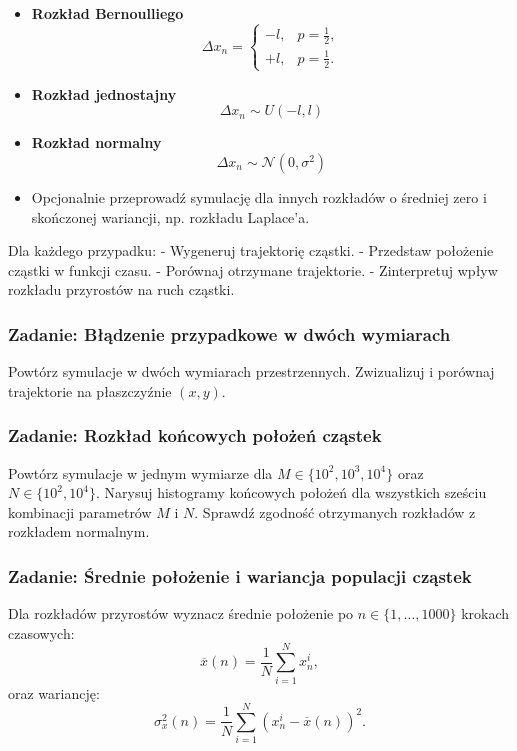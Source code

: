 \documentclass[
  polish,
  letterpaper,
  DIV=11,
  numbers=noendperiod]{scrartcl}
\begin{document}
\begin{itemize}
\item
  \textbf{Rozkład Bernoulliego} \[
  \Delta x_n=
  \begin{cases}
  -l, & p=\frac{1}{2},\\
  +l, & p=\frac{1}{2}.
  \end{cases}
  \]
\item
  \textbf{Rozkład jednostajny} \[\Delta x_n\sim U(-l,l)\]
\item
  \textbf{Rozkład normalny} \[\Delta x_n\sim\mathcal{N}(0,\sigma^2)
  \]
\item
  Opcjonalnie przeprowadź symulację dla innych rozkładów o średniej zero
  i skończonej wariancji, np. rozkładu Laplace'a.
\end{itemize}

Dla każdego przypadku: - Wygeneruj trajektorię cząstki. - Przedstaw
położenie cząstki w funkcji czasu. - Porównaj otrzymane trajektorie. -
Zinterpretuj wpływ rozkładu przyrostów na ruch cząstki.

\subsubsection{Zadanie: Błądzenie przypadkowe w dwóch
wymiarach}\label{zadanie-bux142ux105dzenie-przypadkowe-w-dwuxf3ch-wymiarach}

Powtórz symulacje w dwóch wymiarach przestrzennych. Zwizualizuj i
porównaj trajektorie na płaszczyźnie \((x,y)\).

\subsubsection{Zadanie: Rozkład końcowych położeń
cząstek}\label{zadanie-rozkux142ad-koux144cowych-poux142oux17ceux144-czux105stek}

Powtórz symulacje w jednym wymiarze dla \(M\in\{10^2,10^3,10^4\}\) oraz
\(N\in\{10^2,10^4\}\). Narysuj histogramy końcowych położeń dla
wszystkich sześciu kombinacji parametrów \(M\) i \(N\). Sprawdź zgodność
otrzymanych rozkładów z rozkładem normalnym.

\subsubsection{Zadanie: Średnie położenie i wariancja populacji
cząstek}\label{zadanie-ux15brednie-poux142oux17cenie-i-wariancja-populacji-czux105stek}

Dla rozkładów przyrostów wyznacz średnie położenie po
\(n\in\{1,\ldots,1000\}\) krokach czasowych: \[
\overline{x}(n)=\frac{1}{N}\sum_{i=1}^{N}x_n^i,
\] oraz wariancję: \[
\sigma_x^2(n)=
\frac{1}{N}\sum_{i=1}^{N}
\left(x_n^i-\overline{x}(n)\right)^2.
\]
\end{document}
